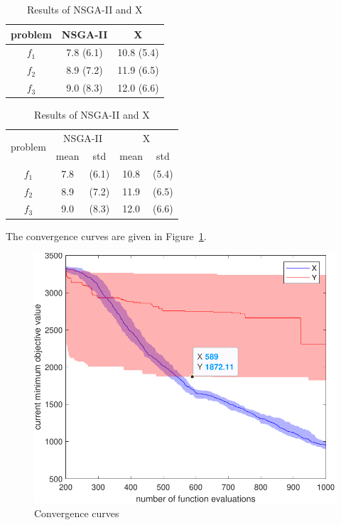 \documentclass{IEEEtran}
\begin{document}
\begin{table}
	\centering
	\caption{Results of NSGA-II and X}
	\label{table_1}
	\begin{tabular}{c c c}
		\toprule
		problem & NSGA-II & X \\
		\midrule
		$f_1$ &  7.8 (6.1) & 10.8 (5.4) \\
		$f_2$ &  8.9 (7.2) & 11.9 (6.5) \\
		$f_3$ &  9.0 (8.3) & 12.0 (6.6) \\
		\bottomrule 
	\end{tabular}
\end{table}



\begin{table}
	\centering
	\caption{Results of NSGA-II and X}
	\label{table_2}
	\begin{tabular}{c c c c c}
		\toprule
		\multirow{2}{*}{problem} & \multicolumn{2}{c}{NSGA-II} & \multicolumn{2}{c}{X}\\
		        & mean  & std & mean & std \\		
		\midrule
		$f_1$ &  7.8 & (6.1) & 10.8 & (5.4) \\
		$f_2$ &  8.9 & (7.2) & 11.9 & (6.5) \\
		$f_3$ &  9.0 & (8.3) & 12.0 & (6.6) \\
		\bottomrule 
	\end{tabular}
\end{table}



The convergence curves are given in Figure~\ref{fig_1}.

\begin{figure}
	\includegraphics[width=\linewidth]{figure_1.pdf}
	\caption{Convergence curves}
	\label{fig_1}
\end{figure}
\end{document}
